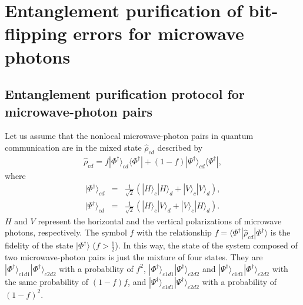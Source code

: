 \documentclass[showpacs,aps,graphicx,twocolumn]{revtex4}
\begin{document}
\section{Entanglement purification of bit-flipping errors for microwave photons}
\label{sec3}

\subsection{Entanglement purification protocol for microwave-photon pairs}
\label{sec31}


Let us assume that the nonlocal microwave-photon pairs in quantum
communication are in the mixed state $\hat{\rho}_{cd}$ described by
\begin{eqnarray}        \label{rhocd}
\hat{\rho}_{cd}=f|\Phi^{\dag}\rangle_{cd}\langle \Phi^{\dag}|
+(1-f)|\Psi^{\dag}\rangle_{cd}\langle \Psi^{\dag}|,
\end{eqnarray}
where
\begin{eqnarray}        \label{Bellpolarization}
|\Phi^{\dag}\rangle_{cd}&=&\frac{1}{\sqrt{2}}(|H\rangle_{c}|H\rangle_{d}
+|V\rangle_{c}|V\rangle_{d}),\nonumber\\
|\Psi^{\dag}\rangle_{cd}&=&\frac{1}{\sqrt{2}}(|H\rangle_{c}|V\rangle_{d}
+|V\rangle_{c}|H\rangle_{d}).
\end{eqnarray}
$H$ and $V$ represent the horizontal and the vertical polarizations
of microwave photons, respectively. The symbol $f$ with the
relationship $f=\langle
\Phi^{\dag}|\hat{\rho}_{cd}|\Phi^{\dag}\rangle$ is the fidelity of
the state $ |\Phi^{\dag}\rangle$ ($f>\frac{1}{2}$). In this way, the
state of the system composed of two microwave-photon pairs is just
the mixture of four states. They are
$|\Phi^{\dag}\rangle_{c1d1}|\Phi^{\dag}\rangle_{c2d2}$ with a
probability of $f^{2}$,
$|\Phi^{\dag}\rangle_{c1d1}|\Psi^{\dag}\rangle_{c2d2}$ and
$|\Psi^{\dag}\rangle_{c1d1}|\Phi^{\dag}\rangle_{c2d2}$ with the same
probability of $(1-f)f$, and
$|\Psi^{\dag}\rangle_{c1d1}|\Psi^{\dag}\rangle_{c2d2}$ with a
probability of $(1-f)^{2}$.
\end{document}
